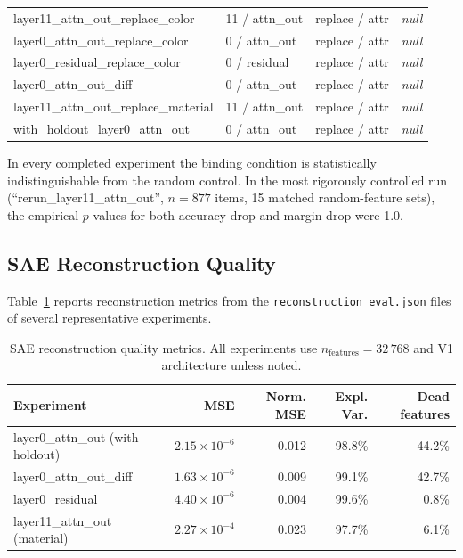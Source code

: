 \documentclass[11pt,a4paper]{article}
\begin{document}
\begin{longtable}{p{5.5cm}p{2.2cm}p{2.2cm}rr}
layer11\_attn\_out\_replace\_color & 11 / attn\_out & replace / attr & \multicolumn{2}{c}{\textit{null}} \\
layer0\_attn\_out\_replace\_color & 0 / attn\_out & replace / attr & \multicolumn{2}{c}{\textit{null}} \\
layer0\_residual\_replace\_color & 0 / residual & replace / attr & \multicolumn{2}{c}{\textit{null}} \\
layer0\_attn\_out\_diff & 0 / attn\_out & replace / attr & \multicolumn{2}{c}{\textit{null}} \\
layer11\_attn\_out\_replace\_material & 11 / attn\_out & replace / attr & \multicolumn{2}{c}{\textit{null}} \\
with\_holdout\_layer0\_attn\_out & 0 / attn\_out & replace / attr & \multicolumn{2}{c}{\textit{null}} \\
\end{longtable}

\noindent In every completed experiment the binding condition is statistically indistinguishable
from the random control. In the most rigorously controlled run
(``rerun\_layer11\_attn\_out'', $n = 877$ items, 15 matched random-feature sets),
the empirical $p$-values for both accuracy drop and margin drop were 1.0.

\subsection{SAE Reconstruction Quality}

Table~\ref{tab:sae_recon} reports reconstruction metrics from the \texttt{reconstruction\_eval.json}
files of several representative experiments.

\begin{table}[ht]
\centering
\caption{SAE reconstruction quality metrics. All experiments use $n_{\mathrm{features}} = 32\,768$
  and V1 architecture unless noted.}
\label{tab:sae_recon}
\begin{tabular}{lrrrr}
\toprule
Experiment & MSE & Norm. MSE & Expl. Var. & Dead features \\
\midrule
layer0\_attn\_out (with holdout) & $2.15 \times 10^{-6}$ & 0.012 & 98.8\% & 44.2\% \\
layer0\_attn\_out\_diff           & $1.63 \times 10^{-6}$ & 0.009 & 99.1\% & 42.7\% \\
layer0\_residual                  & $4.40 \times 10^{-6}$ & 0.004 & 99.6\% & 0.8\%  \\
layer11\_attn\_out (material)     & $2.27 \times 10^{-4}$ & 0.023 & 97.7\% & 6.1\%  \\
\bottomrule
\end{tabular}
\end{table}
\end{document}
